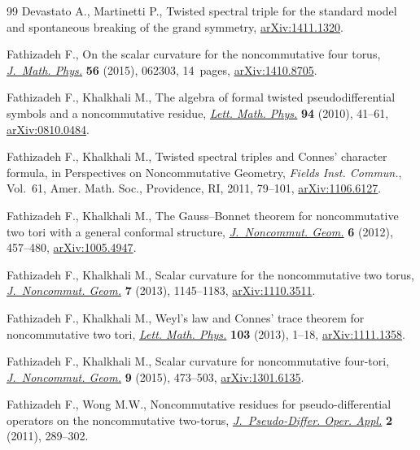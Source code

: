 \documentclass[pdftex]{sigma}
\numberwithin{equation}{section}
\begin{document}
\begin{thebibliography}{99}
Devastato A., Martinetti P., Twisted spectral triple for the standard model and
 spontaneous breaking of the grand symmetry, \href{http://arxiv.org/abs/1411.1320}{arXiv:1411.1320}.

Fathizadeh F., On the scalar curvature for the noncommutative four torus,
 \href{http://dx.doi.org/10.1063/1.4922815}{\textit{J.~Math. Phys.}} \textbf{56} (2015), 062303, 14~pages,
 \href{http://arxiv.org/abs/1410.8705}{arXiv:1410.8705}.

Fathizadeh F., Khalkhali M., The algebra of formal twisted pseudodif\/ferential
 symbols and a noncommutative residue, \href{http://dx.doi.org/10.1007/s11005-010-0419-z}{\textit{Lett. Math. Phys.}} \textbf{94}
 (2010), 41--61, \href{http://arxiv.org/abs/0810.0484}{arXiv:0810.0484}.

Fathizadeh F., Khalkhali M., Twisted spectral triples and {C}onnes' character
 formula, in Perspectives on Noncommutative Geometry, \textit{Fields Inst.
 Commun.}, Vol.~61, Amer. Math. Soc., Providence, RI, 2011, 79--101,
 \href{http://arxiv.org/abs/1106.6127}{arXiv:1106.6127}.

Fathizadeh F., Khalkhali M., The {G}auss--{B}onnet theorem for noncommutative
 two tori with a general conformal structure, \href{http://dx.doi.org/10.4171/JNCG/97}{\textit{J.~Noncommut. Geom.}}
 \textbf{6} (2012), 457--480, \href{http://arxiv.org/abs/1005.4947}{arXiv:1005.4947}.

Fathizadeh F., Khalkhali M., Scalar curvature for the noncommutative two torus,
 \href{http://dx.doi.org/10.4171/JNCG/145}{\textit{J.~Noncommut. Geom.}} \textbf{7} (2013), 1145--1183,
 \href{http://arxiv.org/abs/1110.3511}{arXiv:1110.3511}.

Fathizadeh F., Khalkhali M., Weyl's law and {C}onnes' trace theorem for
 noncommutative two tori, \href{http://dx.doi.org/10.1007/s11005-012-0593-2}{\textit{Lett. Math. Phys.}} \textbf{103} (2013),
 1--18, \href{http://arxiv.org/abs/1111.1358}{arXiv:1111.1358}.

Fathizadeh F., Khalkhali M., Scalar curvature for noncommutative four-tori,
 \href{http://dx.doi.org/10.4171/JNCG/198}{\textit{J.~Noncommut. Geom.}} \textbf{9} (2015), 473--503, \href{http://arxiv.org/abs/1301.6135}{arXiv:1301.6135}.

Fathizadeh F., Wong M.W., Noncommutative residues for pseudo-dif\/ferential
 operators on the noncommutative two-torus, \href{http://dx.doi.org/10.1007/s11868-011-0030-9}{\textit{J.~Pseudo-Differ. Oper.
 Appl.}} \textbf{2} (2011), 289--302.


\end{thebibliography}
\end{document}
